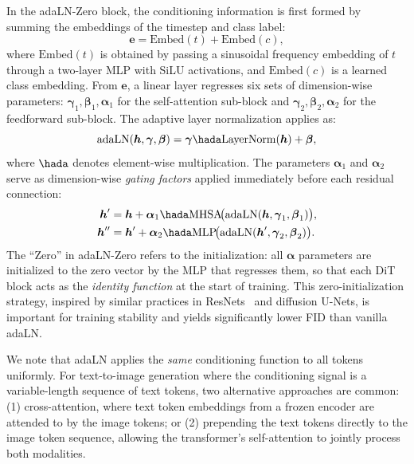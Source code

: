 \documentclass[../../book-main.tex]{subfiles}
\begin{document}
In the adaLN-Zero block, the conditioning information is first formed
by summing the embeddings of the timestep and class label:
\begin{equation}
\boldsymbol{e} = \mathrm{Embed}(t) + \mathrm{Embed}(c),
\end{equation}
where $\mathrm{Embed}(t)$ is obtained by passing a sinusoidal
frequency embedding of $t$ through a two-layer MLP with SiLU
activations, and $\mathrm{Embed}(c)$ is a learned class embedding.
From $\boldsymbol{e}$, a linear layer regresses six sets of
dimension-wise parameters: $\boldsymbol{\gamma}_1,
\boldsymbol{\beta}_1, \boldsymbol{\alpha}_1$ for the self-attention
sub-block and $\boldsymbol{\gamma}_2, \boldsymbol{\beta}_2,
\boldsymbol{\alpha}_2$ for the feedforward sub-block. The adaptive
layer normalization applies as:
\begin{equation}
\mathrm{adaLN}(\boldsymbol{h}, \boldsymbol{\gamma},
\boldsymbol{\beta}) = \boldsymbol{\gamma} \hada
\mathrm{LayerNorm}(\boldsymbol{h}) + \boldsymbol{\beta},
\end{equation}
where $\hada$ denotes element-wise multiplication. The parameters
$\boldsymbol{\alpha}_1$ and $\boldsymbol{\alpha}_2$ serve as
dimension-wise \emph{gating factors} applied immediately before each
residual connection:
\begin{equation}
\begin{aligned}
    \boldsymbol{h}' &= \boldsymbol{h} + \boldsymbol{\alpha}_1 \hada
    \mathrm{MHSA}\!\big(\mathrm{adaLN}(\boldsymbol{h},
    \boldsymbol{\gamma}_1, \boldsymbol{\beta}_1)\big), \\
    \boldsymbol{h}'' &= \boldsymbol{h}' + \boldsymbol{\alpha}_2 \hada
    \mathrm{MLP}\!\big(\mathrm{adaLN}(\boldsymbol{h}',
    \boldsymbol{\gamma}_2, \boldsymbol{\beta}_2)\big).
\end{aligned}
\end{equation}
The ``Zero'' in adaLN-Zero refers to the initialization: all
$\boldsymbol{\alpha}$ parameters are initialized to the zero vector
by the MLP that regresses them, so that each DiT block acts as the
\emph{identity function} at the start of training. This
zero-initialization strategy, inspired by similar practices in
ResNets~\citep{goyal2017accurate} and diffusion U-Nets, is important
for training stability and yields significantly lower FID than vanilla adaLN.

We note that adaLN applies the \emph{same} conditioning function to
all tokens uniformly. For text-to-image generation where the
conditioning signal is a variable-length sequence of text tokens, two
alternative approaches are common: (1) cross-attention, where text
token embeddings from a frozen encoder are attended to by the image
tokens; or (2) prepending the text tokens directly to the image token
sequence, allowing the transformer's self-attention to jointly
process both modalities.
\end{document}
